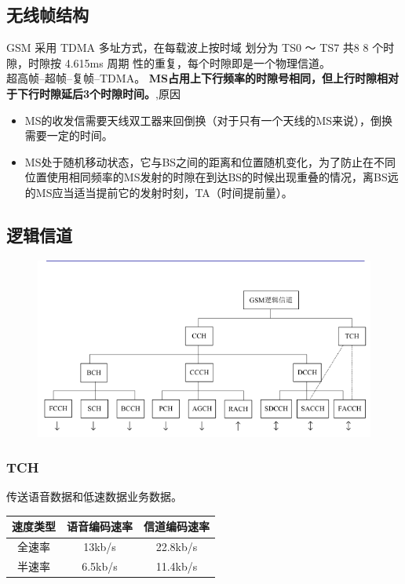 \subsection{无线帧结构}
GSM 采用 TDMA 多址方式，在每载波上按时域
划分为 TS0 ～ TS7 共8 8 个时隙，时隙按 4.615ms 周期
性的重复，每个时隙即是一个物理信道。\\
超高帧--超帧--复帧--TDMA。
\textbf{MS占用上下行频率的时隙号相同，但上行时隙相对于下行时隙延后3个时隙时间。},原因
\begin{itemize}
	\item MS的收发信需要天线双工器来回倒换（对于只有一个天线的MS来说），倒换需要一定的时间。
	\item MS处于随机移动状态，它与BS之间的距离和位置随机变化，为了防止在不同位置使用相同频率的MS发射的时隙在到达BS的时候出现重叠的情况，离BS远的MS应当适当提前它的发射时刻，TA（时间提前量）。
\end{itemize}
\subsection{逻辑信道}
\begin{figure}[tbph]
	\centering
	\includegraphics[width=0.7\linewidth]{figures/screenshot008}
	\caption{}
	\label{fig:screenshot008}
\end{figure}
\subsubsection{TCH}
传送语音数据和低速数据业务数据。
\begin{table}[htbp]
	\begin{tabular}{|c|c|c|}
		\hline 
		速度类型 & 语音编码速率 & 信道编码速率 \\ 
		\hline 
		全速率 & 13kb/s & 22.8kb/s \\ 
		\hline 
		半速率 & 6.5kb/s & 11.4kb/s \\ 
		\hline 
	\end{tabular} 	
\end{table}
